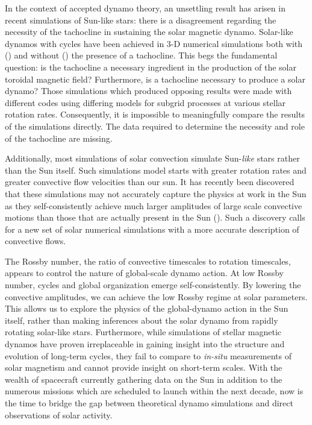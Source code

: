 \documentclass[aasms,12pt]{article}
\begin{document}
In the context of accepted dynamo theory, an unsettling result has arisen
in recent simulations of Sun-like stars: there is a disagreement
regarding the necessity of the tachocline
in sustaining the solar magnetic dynamo.  Solar-like dynamos
with cycles  have been
achieved in 3-D numerical simulations both with
(\citealt{ghizaru2010, racine2011})
and without (\citealt{brown2011, nelson2013}) the presence of a tachocline. This
begs the fundamental question: is the tachocline a necessary ingredient in the
production of the solar toroidal magnetic field?  Furthermore, is a tachocline
necessary to produce a solar dynamo?  Those simulations which produced opposing
results were made with different codes using differing models for subgrid
processes at various stellar rotation rates.  Consequently, it is impossible to
meaningfully compare the results of the simulations directly.  The data required
to determine the necessity and role of the tachocline are missing.

Additionally, most simulations
of solar convection simulate Sun-\emph{like} stars rather than the Sun
itself.  Such simulations model starts with greater rotation rates and greater
convective flow velocities than our sun.  It has recently been discovered
that these simulations may not accurately capture the physics at work
in the Sun as they self-consistently achieve much larger amplitudes of 
large scale convective
motions than those that are actually present in the Sun
(\citealt{lord2014}).  Such a discovery calls for a new set of solar 
numerical simulations with a more accurate description of convective flows.

The Rossby number, the ratio of convective timescales to rotation timescales,
appears to control the nature of global-scale dynamo action.  At low Rossby
number, cycles and global organization emerge self-consistently.  By lowering
the convective amplitudes, we can achieve the low Rossby regime at solar
parameters.  This allows us to explore the physics of the global-dynamo action
in the Sun itself, rather than making inferences about the solar dynamo from
rapidly rotating solar-like stars.
Furthermore, while simulations of stellar magnetic dynamos have proven
irreplaceable in gaining insight into the structure and evolution of 
long-term cycles, they fail to compare to \emph{in-situ} measurements
of solar magnetism and cannot provide insight on short-term scales.
With the wealth of spacecraft currently gathering data on
the Sun in addition to the numerous missions which are scheduled to launch
within the next decade, now is the time to bridge the gap between theoretical
dynamo simulations and direct observations of solar activity.
\end{document}
